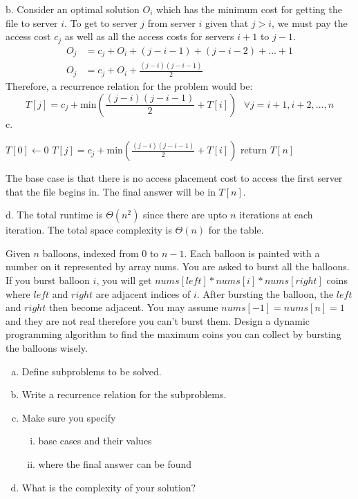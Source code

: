\documentclass[12pt]{article}
\newenvironment{problem}[2][Problem]{\begin{trivlist}
\item[\hskip \labelsep {\bfseries #1}\hskip \labelsep {\bfseries #2.}]}{\end{trivlist}}
\begin{document}
b. Consider an optimal solution $O_i$ which has the minimum cost for getting the file to server $i$. To get to server $j$ from server $i$ given that $j>i$, we must pay the access cost $c_j$ as well as all the access costs for servers $i+1$ to $j-1$.
\begin{align*}
    O_j &= c_j + O_i + {(j-i-1) + (j-i-2) + ... + 1}\\
    O_j &= c_j + O_i + \frac{(j-i)(j-i-1)}{2}
\end{align*}
Therefore, a recurrence relation for the problem would be:
$$
T[j]=c_j+\text{min}(\frac{(j-i)(j-i-1)}{2}+T[i]) \text{ } \forall j=i+1,i+2,...,n
$$
c.
\begin{algorithmic}
        \State $T[0] \gets 0$
            \State $T[j]=c_j+\text{min}(\frac{(j-i)(j-i-1)}{2}+T[i])$
            \EndFor
        \EndFor
        \State return $T[n]$
    \EndProcedure
\end{algorithmic}
The base case is that there is no access placement cost to access the first server that the file begins in. The final answer will be in $T[n]$.

d. The total runtime is $\Theta(n^2)$ since there are upto $n$ iterations at each iteration. The total space complexity is $\Theta(n)$ for the table.
\begin{problem}{3}
    Given $n$ balloons, indexed from 0 to $n-1$. Each balloon is painted with a number on it represented by array nums. You are asked to burst all the balloons. If you burst balloon $i$, you will get $nums[left]*nums[i]*nums[right]$ coins where $left$ and $right$ are adjacent indices of $i$. After bursting the balloon, the $left$ and $right$ then become adjacent. You may assume $nums[-1]=nums[n]=1$ and they are not real therefore you can't burst them. Design a dynamic programming algorithm to find the maximum coins you can collect by bursting the balloons wisely.
    
    \begin{enumerate}[a.]
        \item Define subproblems to be solved.
        \item Write a recurrence relation for the subproblems.
        \item Make sure you specify
        \begin{enumerate}[i.]
            \item base cases and their values
            \item where the final answer can be found
        \end{enumerate}
        \item What is the complexity of your solution?
    \end{enumerate}
\end{problem}
\end{document}
